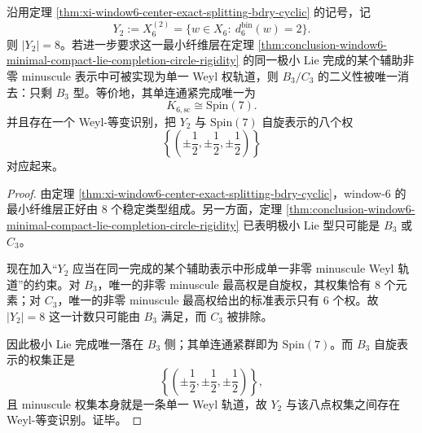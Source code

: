 \begin{theorem}\label{thm:conclusion-window6-minuscule-eightfold-b3-spin7}
沿用定理 \ref{thm:xi-window6-center-exact-splitting-bdry-cyclic} 的记号，记
\[
Y_2:=X_6^{(2)}=\{w\in X_6:\ d_6^{\mathrm{bin}}(w)=2\}.
\]
则 \(|Y_2|=8\)。若进一步要求这一最小纤维层在定理 \ref{thm:conclusion-window6-minimal-compact-lie-completion-circle-rigidity} 的同一极小 Lie 完成的某个辅助非零 minuscule 表示中可被实现为单一 Weyl 权轨道，则 \(B_3/C_3\) 的二义性被唯一消去：只剩 \(B_3\) 型。等价地，其单连通紧完成唯一为
\[
K_{6,\mathrm{sc}}\cong \mathrm{Spin}(7).
\]
并且存在一个 Weyl-等变识别，把 \(Y_2\) 与 \(\mathrm{Spin}(7)\) 自旋表示的八个权
\[
\left\{
\left(\pm\frac12,\pm\frac12,\pm\frac12\right)
\right\}
\]
对应起来。
\end{theorem}
\begin{proof}
由定理 \ref{thm:xi-window6-center-exact-splitting-bdry-cyclic}，window-\(6\) 的最小纤维层正好由 \(8\) 个稳定类型组成。另一方面，定理 \ref{thm:conclusion-window6-minimal-compact-lie-completion-circle-rigidity} 已表明极小 Lie 型只可能是 \(B_3\) 或 \(C_3\)。

现在加入“\(Y_2\) 应当在同一完成的某个辅助表示中形成单一非零 minuscule Weyl 轨道”的约束。对 \(B_3\)，唯一的非零 minuscule 最高权是自旋权，其权集恰有 \(8\) 个元素；对 \(C_3\)，唯一的非零 minuscule 最高权给出的标准表示只有 \(6\) 个权。故 \(|Y_2|=8\) 这一计数只可能由 \(B_3\) 满足，而 \(C_3\) 被排除。

因此极小 Lie 完成唯一落在 \(B_3\) 侧；其单连通紧群即为 \(\mathrm{Spin}(7)\)。而 \(B_3\) 自旋表示的权集正是
\[
\left\{
\left(\pm\frac12,\pm\frac12,\pm\frac12\right)
\right\},
\]
且 minuscule 权集本身就是一条单一 Weyl 轨道，故 \(Y_2\) 与该八点权集之间存在 Weyl-等变识别。证毕。
\end{proof}

